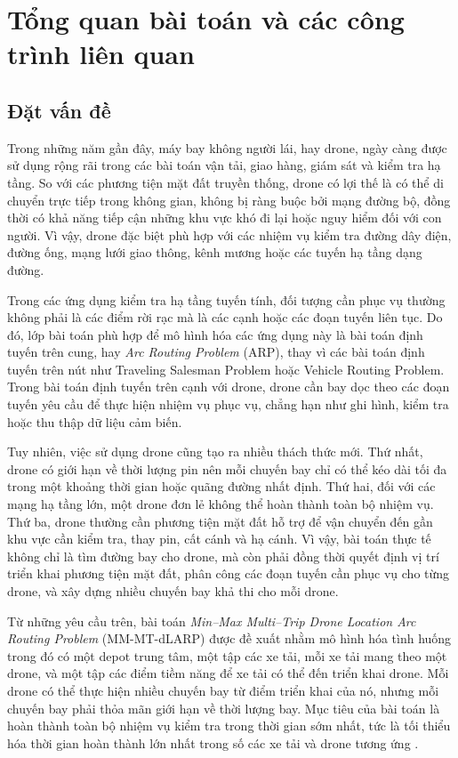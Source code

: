 \chapter{Tổng quan bài toán và các công trình liên quan}
\label{chap:tong-quan}

\section{Đặt vấn đề}

Trong những năm gần đây, máy bay không người lái, hay drone, ngày càng được sử dụng rộng rãi trong các bài toán vận tải, giao hàng, giám sát và kiểm tra hạ tầng. So với các phương tiện mặt đất truyền thống, drone có lợi thế là có thể di chuyển trực tiếp trong không gian, không bị ràng buộc bởi mạng đường bộ, đồng thời có khả năng tiếp cận những khu vực khó đi lại hoặc nguy hiểm đối với con người. Vì vậy, drone đặc biệt phù hợp với các nhiệm vụ kiểm tra đường dây điện, đường ống, mạng lưới giao thông, kênh mương hoặc các tuyến hạ tầng dạng đường.

Trong các ứng dụng kiểm tra hạ tầng tuyến tính, đối tượng cần phục vụ thường không phải là các điểm rời rạc mà là các cạnh hoặc các đoạn tuyến liên tục. Do đó, lớp bài toán phù hợp để mô hình hóa các ứng dụng này là bài toán định tuyến trên cung, hay \textit{Arc Routing Problem} (ARP), thay vì các bài toán định tuyến trên nút như Traveling Salesman Problem hoặc Vehicle Routing Problem. Trong bài toán định tuyến trên cạnh với drone, drone cần bay dọc theo các đoạn tuyến yêu cầu để thực hiện nhiệm vụ phục vụ, chẳng hạn như ghi hình, kiểm tra hoặc thu thập dữ liệu cảm biến.

Tuy nhiên, việc sử dụng drone cũng tạo ra nhiều thách thức mới. Thứ nhất, drone có giới hạn về thời lượng pin nên mỗi chuyến bay chỉ có thể kéo dài tối đa trong một khoảng thời gian hoặc quãng đường nhất định. Thứ hai, đối với các mạng hạ tầng lớn, một drone đơn lẻ không thể hoàn thành toàn bộ nhiệm vụ. Thứ ba, drone thường cần phương tiện mặt đất hỗ trợ để vận chuyển đến gần khu vực cần kiểm tra, thay pin, cất cánh và hạ cánh. Vì vậy, bài toán thực tế không chỉ là tìm đường bay cho drone, mà còn phải đồng thời quyết định vị trí triển khai phương tiện mặt đất, phân công các đoạn tuyến cần phục vụ cho từng drone, và xây dựng nhiều chuyến bay khả thi cho mỗi drone.

Từ những yêu cầu trên, bài toán \textit{Min--Max Multi--Trip Drone Location Arc Routing Problem} (MM-MT-dLARP) được đề xuất nhằm mô hình hóa tình huống trong đó có một depot trung tâm, một tập các xe tải, mỗi xe tải mang theo một drone, và một tập các điểm tiềm năng để xe tải có thể đến triển khai drone. Mỗi drone có thể thực hiện nhiều chuyến bay từ điểm triển khai của nó, nhưng mỗi chuyến bay phải thỏa mãn giới hạn về thời lượng bay. Mục tiêu của bài toán là hoàn thành toàn bộ nhiệm vụ kiểm tra trong thời gian sớm nhất, tức là tối thiểu hóa thời gian hoàn thành lớn nhất trong số các xe tải và drone tương ứng \cite{corberan2025mmdlarp}.

